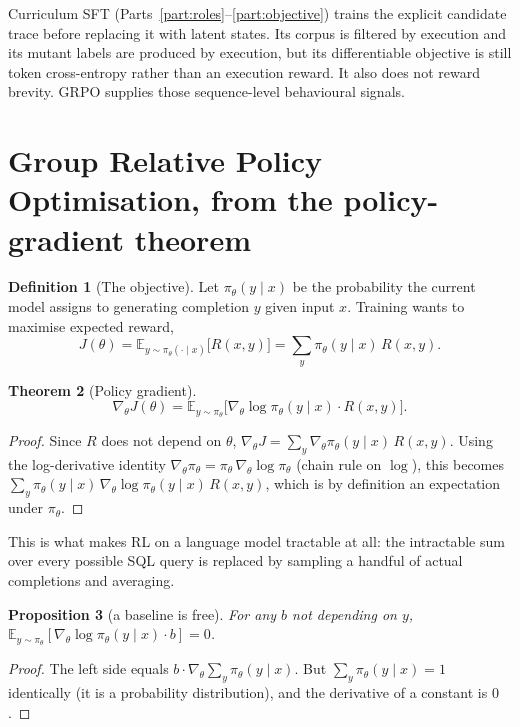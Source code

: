 \documentclass[11pt]{article}
\newtheorem{theorem}{Theorem}
\newtheorem{proposition}[theorem]{Proposition}
\theoremstyle{definition}
\newtheorem{definition}[theorem]{Definition}
\begin{document}
Curriculum SFT (Parts~\ref{part:roles}--\ref{part:objective}) trains the explicit candidate trace before replacing it with latent states. Its corpus is filtered by execution and its mutant labels are produced by execution, but its differentiable objective is still token cross-entropy rather than an execution reward. It also does not reward brevity. GRPO supplies those sequence-level behavioural signals.

\section{Group Relative Policy Optimisation, from the policy-gradient theorem}

\begin{definition}[The objective]
Let $\pi_\theta(y\mid x)$ be the probability the current model assigns to generating completion $y$ given input $x$. Training wants to maximise expected reward,
\[
J(\theta) = \mathbb{E}_{y\sim\pi_\theta(\cdot\mid x)}\big[R(x,y)\big]
= \sum_y \pi_\theta(y\mid x)\,R(x,y).
\]
\end{definition}

\begin{theorem}[Policy gradient]
\label{thm:pg}
\[
\nabla_\theta J(\theta) = \mathbb{E}_{y\sim\pi_\theta}\big[\nabla_\theta\log\pi_\theta(y\mid x)\cdot R(x,y)\big].
\]
\end{theorem}
\begin{proof}
Since $R$ does not depend on $\theta$, $\nabla_\theta J = \sum_y \nabla_\theta\pi_\theta(y\mid x)\,R(x,y)$. Using the log-derivative identity $\nabla_\theta\pi_\theta = \pi_\theta\,\nabla_\theta\log\pi_\theta$ (chain rule on $\log$), this becomes $\sum_y \pi_\theta(y\mid x)\,\nabla_\theta\log\pi_\theta(y\mid x)\,R(x,y)$, which is by definition an expectation under $\pi_\theta$.
\end{proof}

This is what makes RL on a language model tractable at all: the intractable sum over every possible SQL query is replaced by sampling a handful of actual completions and averaging.

\begin{proposition}[a baseline is free]
\label{prop:baseline}
For any $b$ not depending on $y$, $\mathbb{E}_{y\sim\pi_\theta}[\nabla_\theta\log\pi_\theta(y\mid x)\cdot b] = 0$.
\end{proposition}
\begin{proof}
The left side equals $b\cdot\nabla_\theta\sum_y\pi_\theta(y\mid x)$. But $\sum_y \pi_\theta(y\mid x)=1$ identically (it is a probability distribution), and the derivative of a constant is $0$.
\end{proof}
\end{document}
